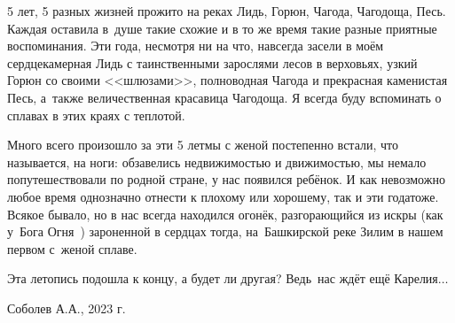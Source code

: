 {5 лет, 5 разных жизней прожито на реках Лидь, Горюн, Чагода, Чагодоща, Песь. Каждая оставила в~душе такие схожие и в то же время такие разные приятные воспоминания. Эти года, несмотря ни на что, навсегда засели в моём сердце\mdash камерная Лидь с таинственными зарослями лесов в верховьях, узкий Горюн со своими <<шлюзами>>, полноводная Чагода и прекрасная каменистая Песь, а~также величественная красавица Чагодоща. Я всегда буду вспоминать о сплавах в этих краях с теплотой.

Много всего произошло за эти 5 лет\mdash мы с женой постепенно встали, что называется, на ноги: обзавелись недвижимостью и движимостью, мы немало попутешествовали по родной стране, у нас появился ребёнок. И как невозможно любое время однозначно отнести к плохому или хорошему, так и эти года\mdash тоже. Всякое бывало, но в нас всегда находился огонёк, разгорающийся из искры (как у~Бога Огня~\cite{Территория}) зароненной в сердцах тогда, на~Башкирской реке Зилим в нашем первом с~женой сплаве.

Эта летопись подошла к концу, а будет ли другая? Ведь~нас ждёт ещё Карелия$\ldots$

\vspace{5mm}
\begin{flushright}
Соболев А.А., 2023 г.
\end{flushright}

}
